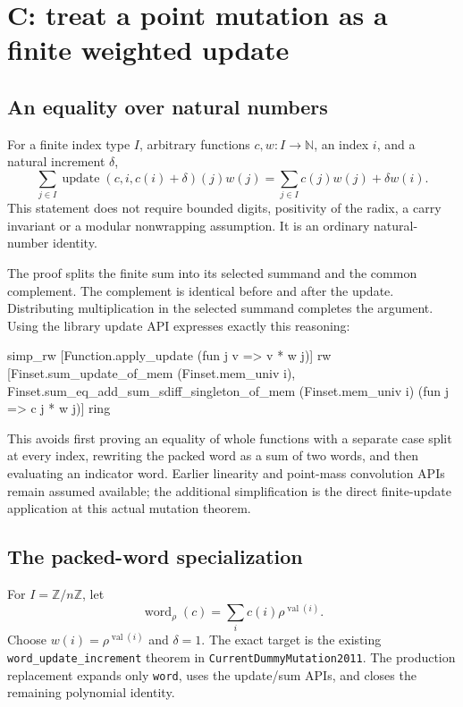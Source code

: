 \documentclass[11pt,letterpaper]{article}
\newcommand{\code}[1]{\nolinkurl{#1}}
\newcommand{\NN}{\mathbb N}
\newcommand{\ZZ}{\mathbb Z}
\newcommand{\Zmod}[1]{\ZZ/#1\ZZ}
\begin{document}
\section{C: treat a point mutation as a finite weighted update}

\subsection{An equality over natural numbers}

For a finite index type \(I\), arbitrary functions \(c,w:I\to\NN\), an index \(i\), and a natural increment \(\delta\),
\[
 \sum_{j\in I}\operatorname{update}(c,i,c(i)+\delta)(j)w(j)
 =\sum_{j\in I}c(j)w(j)+\delta w(i).
\]
This statement does not require bounded digits, positivity of the radix, a carry invariant or a modular nonwrapping assumption. It is an ordinary natural-number identity.

The proof splits the finite sum into its selected summand and the common complement. The complement is identical before and after the update. Distributing multiplication in the selected summand completes the argument. Using the library update API expresses exactly this reasoning:
\begin{Lean}
simp_rw [Function.apply_update (fun j v => v * w j)]
rw [Finset.sum_update_of_mem (Finset.mem_univ i),
  Finset.sum_eq_add_sum_sdiff_singleton_of_mem
    (Finset.mem_univ i) (fun j => c j * w j)]
ring
\end{Lean}

This avoids first proving an equality of whole functions with a separate case split at every index, rewriting the packed word as a sum of two words, and then evaluating an indicator word. Earlier linearity and point-mass convolution APIs remain assumed available; the additional simplification is the direct finite-update application at this actual mutation theorem.

\subsection{The packed-word specialization}

For \(I=\Zmod{n}\), let
\[
 \operatorname{word}_\rho(c)=\sum_i c(i)\rho^{\operatorname{val}(i)}.
\]
Choose \(w(i)=\rho^{\operatorname{val}(i)}\) and \(\delta=1\). The exact target is the existing \code{word_update_increment} theorem in \code{CurrentDummyMutation2011}. The production replacement expands only \code{word}, uses the update/sum APIs, and closes the remaining polynomial identity.
\end{document}
